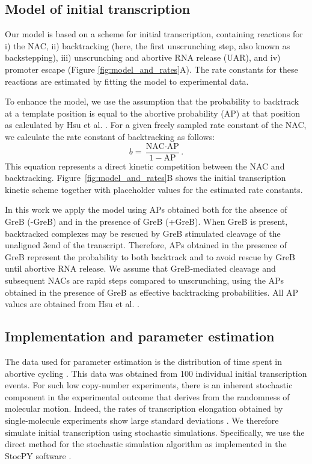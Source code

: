 %
\subsection{Model of initial transcription}
Our model is based on a scheme for initial transcription, containing
reactions for i) the NAC, ii) backtracking (here, the first unscrunching step,
also known as backstepping), iii) unscrunching and abortive RNA release (UAR),
and iv) promoter escape (Figure \ref{fig:model_and_rates}A). The rate
constants for these reactions are estimated by fitting the model to
experimental data.

To enhance the model, we use the assumption that the probability to
backtrack at a template position is equal to the abortive probability (AP) at
that position as calculated by Hsu et al. \cite{hsu_initial_2006}. For a given
freely sampled rate constant of the NAC, we calculate the rate constant of
backtracking as follows:
\begin{equation}
  b = \frac{\text{NAC}\cdot\text{AP}}{1-\text{AP}}.
  \label{eq:backtrackingcalc}
\end{equation}
This equation represents a direct kinetic competition between the NAC and
backtracking. Figure~\ref{fig:model_and_rates}B shows the initial
transcription kinetic scheme together with placeholder values for the
estimated rate constants.

In this work we apply the model using APs obtained both for the absence of
GreB (-GreB) and in the presence of GreB (+GreB). When GreB is present,
backtracked complexes may be rescued by GreB stimulated cleavage of the
unaligned 3\ppp end of the transcript. Therefore, APs obtained in the presence
of GreB represent the probability to both backtrack and to avoid rescue by
GreB until abortive RNA release. We assume that GreB-mediated cleavage and
subsequent NACs are rapid steps compared to unscrunching, using the APs
obtained in the presence of GreB as effective backtracking probabilities. All
AP values are obtained from Hsu et al. \cite{hsu_initial_2006}.

\subsection{Implementation and parameter estimation}
The data used for parameter estimation is the distribution of time spent in
abortive cycling \cite{revyakin_abortive_2006}. This data was obtained from
100 individual initial transcription events. For such low copy-number
experiments, there is an inherent stochastic component in the experimental
outcome that derives from the randomness of molecular motion. Indeed, the
rates of transcription elongation obtained by single-molecule experiments show
large standard deviations \cite{adelman_single_2002,
tolic-norrelykke_diversity_2004}. We therefore simulate initial transcription
using stochastic simulations. Specifically, we use the direct method for the
stochastic simulation algorithm \cite{gillespie_exact_1977} as implemented in
the StocPY software \cite{maarleveld_stochpy:_2013}. 

